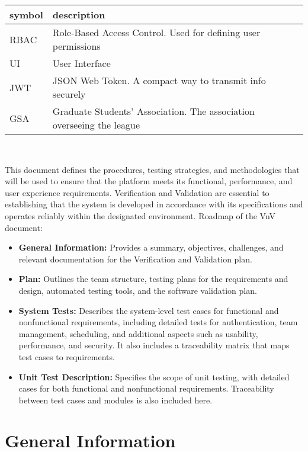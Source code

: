 \documentclass[12pt, titlepage]{article}
\begin{document}
\renewcommand{\arraystretch}{1.2}
\begin{tabular}{l l} 
  \toprule		
  \textbf{symbol} & \textbf{description}\\
  \midrule 
  RBAC & Role-Based Access Control. Used for defining user permissions\\
  UI & User Interface\\
  JWT & JSON Web Token. A compact way to transmit info securely\\
  GSA & Graduate Students' Association. The association overseeing the league\\
  \bottomrule
\end{tabular}\\

\newpage


This document defines the procedures, testing strategies, and methodologies that will be used to ensure that the platform meets its functional, performance, and user experience requirements. Verification and Validation are essential to establishing that the system is developed in accordance with its specifications and operates reliably within the designated environment.
Roadmap of the VnV document:
\begin{itemize}
  \item \textbf{General Information:} Provides a summary, objectives, challenges, and relevant documentation for the Verification and Validation plan.
  \item \textbf{Plan:} Outlines the team structure, testing plans for the requirements and design, automated testing tools, and the software validation plan.
  \item \textbf{System Tests:} Describes the system-level test cases for functional and nonfunctional requirements, including detailed tests for authentication, team management, scheduling, and additional aspects such as usability, performance, and security. It also includes a traceability matrix that maps test cases to requirements.
  \item \textbf{Unit Test Description:} Specifies the scope of unit testing, with detailed cases for both functional and nonfunctional requirements. Traceability between test cases and modules is also included here.
\end{itemize}

\section{General Information}
\end{document}
